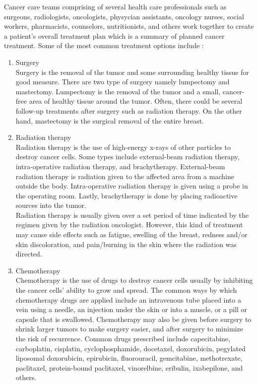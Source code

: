 	Cancer care teams comprising of several health care professionals such as surgeons, radiologists, oncologists, physycian assistants, oncology nurses, social workers, pharmacists, counselors, nutritionists, and others work together to create a patient's overall treatment plan which is a summary of planned cancer treatment. Some of the most common treatment options include \cite{cancerTreatmentSpecific}:

\begin{enumerate}
	\item Surgery \\
	Surgery is the removal of the tumor and some surrounding healthy tissue for good measure. There are two type of surgery namely lumpectomy and mastectomy. Lumpectomy is the removal of the tumor and a small, cancer-free area of healthy tissue around the tumor. Often, there could be several follow-up treatments after surgery such as radiation therapy. On the other hand, mastectomy is the surgical removal of the entire breast.

	\item Radiation therapy \\
	Radiation therapy is the use of high-energy x-rays of other particles to destroy cancer cells. Some types include external-beam radiation therapy, intra-operative radiation therapy, and brachytherapy. External-beam radiation therapy is radiation given to the affected area from a machine outside the body. Intra-operative radiation therapy is given using a probe in the operating room. Lastly, brachytherapy is done by placing radioactive sources into the tumor. \\

	Radiation therapy is usually given over a set period of time indicated by the regimen given by the radiation oncologist. However, this kind of treatment may cause side effects such as fatigue, swelling of the breast, redness and/or skin discoloration, and pain/burning in the skin where the radiation was directed.

	\item Chemotherapy \\
	Chemotherapy is the use of drugs to destroy cancer cells usually by inhibiting the cancer cells' ability to grow and spread. The common ways by which chemotherapy drugs are applied include an intravenous tube placed into a vein using a needle, an injection under the skin or into a muscle, or a pill or capsule that is swallowed. Chemotherapy may also be given before surgery to shrink larger tumors to make surgery easier, and after surgery to minimize the risk of recurrence. Common drugs prescribed include capecitabine, carboplatin, cisplatin, cyclophosphamide, docetaxel, doxorubicin, pegylated liposomal doxorubicin, epirubicin, fluorouracil, gemcitabine, methotrexate, paclitaxel, protein-bound paclitaxel, vinorelbine, eribulin, ixabepilone, and others. \\


\end{enumerate}
